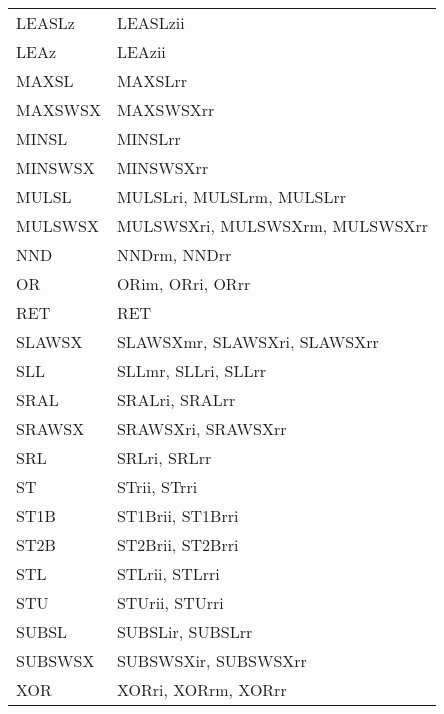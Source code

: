 \begin{xltabular}{\textwidth}{lX}
    LEASLz & LEASLzii \\
    LEAz & LEAzii \\
    MAXSL & MAXSLrr \\
    MAXSWSX & MAXSWSXrr \\
    MINSL & MINSLrr \\
    MINSWSX & MINSWSXrr \\
    MULSL & MULSLri, MULSLrm, MULSLrr \\
    MULSWSX & MULSWSXri, MULSWSXrm, MULSWSXrr \\
    NND & NNDrm, NNDrr \\
    OR & ORim, ORri, ORrr \\
    RET & RET \\
    SLAWSX & SLAWSXmr, SLAWSXri, SLAWSXrr \\
    SLL & SLLmr, SLLri, SLLrr \\
    SRAL & SRALri, SRALrr \\
    SRAWSX & SRAWSXri, SRAWSXrr \\
    SRL & SRLri, SRLrr \\
    ST & STrii, STrri \\
    ST1B & ST1Brii, ST1Brri \\
    ST2B & ST2Brii, ST2Brri \\
    STL & STLrii, STLrri \\
    STU & STUrii, STUrri \\
    SUBSL & SUBSLir, SUBSLrr \\
    SUBSWSX & SUBSWSXir, SUBSWSXrr \\
    XOR & XORri, XORrm, XORrr \\    
\end{xltabular}